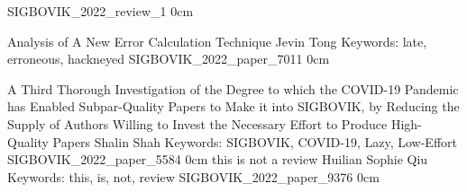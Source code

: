 \addreview
    {SIGBOVIK_2022_review_1}
    {0cm}

\addpaper
    {Analysis of A New Error Calculation Technique}
    {Jevin Tong} 
    {Keywords: late, erroneous, hackneyed}
    {SIGBOVIK_2022_paper_7011}
    {0cm}
    {}

\addpaper
    {A Third Thorough Investigation of the Degree to which the COVID-19 Pandemic has Enabled Subpar-Quality Papers to Make it into SIGBOVIK, by Reducing the Supply of Authors Willing to Invest the Necessary Effort to Produce High-Quality Papers}
    {Shalin Shah}
    {Keywords: SIGBOVIK, COVID-19, Lazy, Low-Effort}
    {SIGBOVIK_2022_paper_5584}
    {0cm}
    {}
\addpaper
    {this is not a review}
    {Huilian Sophie Qiu}
    {Keywords: this, is, not, review}
    {SIGBOVIK_2022_paper_9376}
    {0cm}
    {}


